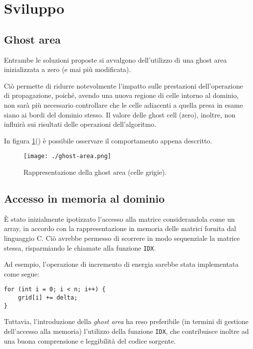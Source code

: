 \section{Sviluppo}

\subsection{Ghost area}

Entrambe le soluzioni proposte si avvalgono dell'utilizzo di una ghost area
inizializzata a zero (e mai più modificata).

Ciò permette di ridurre notevolmente l'impatto sulle prestazioni
dell'operazione di propagazione, poiché, avendo una nuova regione di celle
intorno al dominio, non sarà più necessario controllare che le celle adiacenti a
quella presa in esame siano ai bordi del dominio stesso.
Il valore delle ghost cell (zero), inoltre, non influirà sui risultati delle
operazioni dell'algoritmo.

In figura \ref{fig:ghostarea}(\cite{marzollaghost}) è possibile osservare il
comportamento appena descritto.

\begin{figure}[!ht]
  \centering
  \texttt{[image: ./ghost-area.png]}
  \caption{Rappresentazione della ghost area (celle
  grigie).}\label{fig:ghostarea}
\end{figure}

\subsection{Accesso in memoria al dominio}

È stato inizialmente ipotizzato l'accesso alla matrice considerandola come un
array, in accordo con la rappresentazione in memoria delle matrici fornita dal
linguaggio C.
Ciò avrebbe permesso di scorrere in modo sequenziale la matrice stessa,
risparmiando le chiamate alla funzione \texttt{IDX}.

Ad esempio, l'operazione di incremento di energia sarebbe stata implementata
come segue:
\begin{verbatim}
for (int i = 0; i < n; i++) {
    grid[i] += delta;
}
\end{verbatim}

Tuttavia, l'introduzione della \textit{ghost area} ha reso preferibile (in
termini di gestione dell'accesso alla memoria) l'utilizzo della funzione
\texttt{IDX}, che contribuisce inoltre ad una buona comprensione e leggibilità
del codice sorgente.

